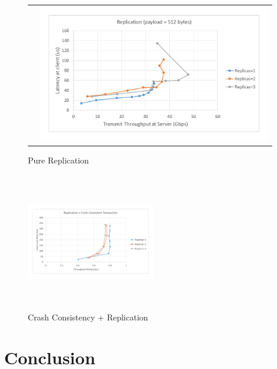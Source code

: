 \documentclass[letterpaper,twocolumn,10pt]{article}
\begin{document}
\begin{figure}
\begin{tabular}{cc}
\begin{minipage}{0.5\textwidth}
\end{minipage}&
\begin{minipage}{0.5\textwidth}
  \includegraphics[width=\textwidth,height=6cm]{results/replication_gbps_512.pdf}
\end{minipage}
\end{tabular}
\caption{Pure Replication}
\label{fig:pure_rep}
\end{figure}

\begin{figure}
  \includegraphics[width=0.5\textwidth,height=6cm]{results/cc_mops.pdf}
  \caption{Crash Consistency + Replication}
  \label{fig:cc_rep}
\end{figure}

\section{Conclusion}
\end{document}

